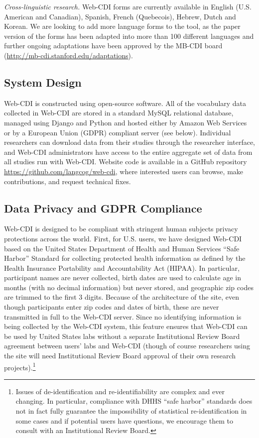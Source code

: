 \documentclass[
  english,
  ,man,floatsintext]{apa6}
\begin{document}
\emph{Cross-linguistic research.} Web-CDI forms are currently available in English (U.S. American and Canadian), Spanish, French (Quebecois), Hebrew, Dutch and Korean. We are looking to add more language forms to the tool, as the paper version of the forms has been adapted into more than 100 different languages and further ongoing adaptations have been approved by the MB-CDI board (\url{http://mb-cdi.stanford.edu/adaptations}).

\hypertarget{system-design}{%
\subsection{System Design}\label{system-design}}

Web-CDI is constructed using open-source software. All of the vocabulary data collected in Web-CDI are stored in a standard MySQL relational database, managed using Django and Python and hosted either by Amazon Web Services or by a European Union (GDPR) compliant server (see below). Individual researchers can download data from their studies through the researcher interface, and Web-CDI administrators have access to the entire aggregate set of data from all studies run with Web-CDI. Website code is available in a GitHub repository \url{https://github.com/langcog/web-cdi}, where interested users can browse, make contributions, and request technical fixes.

\hypertarget{data-privacy-and-gdpr-compliance}{%
\subsection{Data Privacy and GDPR Compliance}\label{data-privacy-and-gdpr-compliance}}

Web-CDI is designed to be compliant with stringent human subjects privacy protections across the world. First, for U.S. users, we have designed Web-CDI based on the United States Department of Health and Human Services ``Safe Harbor'' Standard for collecting protected health information as defined by the Health Insurance Portability and Accountability Act (HIPAA). In particular, participant names are never collected, birth dates are used to calculate age in months (with no decimal information) but never stored, and geographic zip codes are trimmed to the first 3 digits. Because of the architecture of the site, even though participants enter zip codes and dates of birth, these are never transmitted in full to the Web-CDI server. Since no identifying information is being collected by the Web-CDI system, this feature ensures that Web-CDI can be used by United States labs without a separate Institutional Review Board agreement between users' labs and Web-CDI (though of course researchers using the site will need Institutional Review Board approval of their own research projects).\footnote{Issues of de-identification and re-identifiability are complex and ever changing. In particular, compliance with DHHS ``safe harbor'' standards does not in fact fully guarantee the impossibility of statistical re-identification in some cases and if potential users have questions, we encourage them to consult with an Institutional Review Board.}
\end{document}
